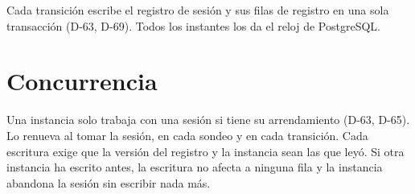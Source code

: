 Cada transición escribe el registro de sesión y sus filas de registro en una sola transacción (D-63, D-69). Todos los instantes los da el reloj de PostgreSQL.

\section{Concurrencia}

Una instancia solo trabaja con una sesión si tiene su arrendamiento (D-63, D-65). Lo renueva al tomar la sesión, en cada sondeo y en cada transición. Cada escritura exige que la versión del registro y la instancia sean las que leyó. Si otra instancia ha escrito antes, la escritura no afecta a ninguna fila y la instancia abandona la sesión sin escribir nada más.
